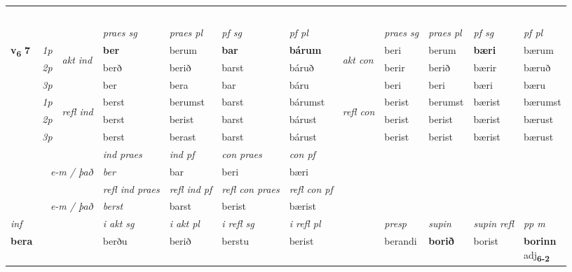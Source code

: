 \begin{longtable}[l]{X>{\footnotesize\itshape}llXXXXlXXXX}
\midrule
  & \\*
   & \\*
     & \\*
   & \\*
  & \\
   \midrule
 & &   & \textit{praes sg}  & \textit{praes pl}    & \textit{ pf sg} & \textit{pf pl} & & \textit{praes sg}  & \textit{praes pl}    & \textit{pf sg} & \textit{pf pl }  \\ \cmidrule{4-7} \cmidrule{9-12}
 \multirow{2}{*}{{{\textbf{v{\textsubscript{6}}} \Large{\textbf{7}}}}}  & 1p & \multirow{3}{*}{\begin{turn}{90}\textit{akt ind}\end{turn}} & \textbf{ber} & berum & \textbf{bar} & \textbf{bárum} & \multirow{3}{*}{\begin{turn}{90}\textit{akt con}\end{turn}} &beri & berum & \textbf{bæri} & bærum\\*
 & 2p &  &  berð  & berið & barst & báruð & & berir & berið & bærir & bæruð \\*
 & 3p &  & ber & bera & bar & báru & & beri & beri& bæri & bæru \\*
\cmidrule{4-7} \cmidrule{9-12}
 & 1p & \multirow{3}{*}{\begin{turn}{90}\textit{refl ind}\end{turn}}  & berst & berumst & barst & bárumst & \multirow{3}{*}{\begin{turn}{90}\textit{refl con}\end{turn}}  &berist & berumst & bærist & bærumst \\*
 & 2p &  & berst & berist & barst & bárust & &berist & berist & bærist & bærust \\*
 & 3p  & & berst & berast & barst & bárust & & berist & berist& bærist & bærust \\*
\cmidrule{4-7} \cmidrule{9-12}

   && &  \textit{ind praes} & \textit{ind pf} & \textit{con praes} & \textit{con pf} \\*
\multicolumn{3}{r}{\textit{e-m / það}} & ber & bar & beri & bæri \\*

\cmidrule{4-7}
 & && \textit{refl ind praes} & \textit{refl ind pf} & \textit{refl con praes} & \textit{refl con pf} \\*
\multicolumn{3}{r}{\textit{e-m / það}}& berst & barst & berist & bærist \\*

\cmidrule{4-7}
   {\textit{inf}} & &  & \textit{i akt sg} & \textit{i akt pl} & \textit{i refl sg} & \textit{i refl pl} && \textit{presp} & \textit{supin} & \textit{supin refl} & \textit{pp m} \\*
  {\textbf{bera}} & && berðu  & berið & berstu & berist && berandi &  \textbf{borið} & borist & \specialcell{\textbf{borinn} \\ adj\textbf{\textsubscript{6-2}}} \\*


\end{longtable}
